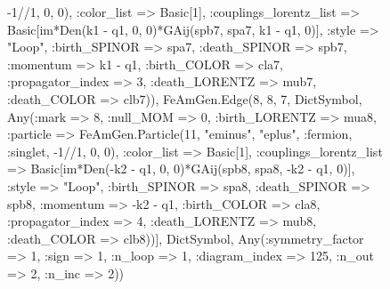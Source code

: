 \documentclass{revtex4}
\begin{document}
\begin{figure}[!htb]
\begin{center}
{-1//1, 0, 0), :color_list => Basic[1], :couplings_lorentz_list => Basic[im*Den(k1 - q1, 0, 0)*GAij(spb7, spa7, k1 - q1, 0)], :style => "Loop", :birth_SPINOR => spa7, :death_SPINOR => spb7, :momentum => k1 - q1, :birth_COLOR => cla7, :propagator_index => 3, :death_LORENTZ => mub7, :death_COLOR => clb7)), FeAmGen.Edge(8, 8, 7, Dict{Symbol, Any}(:mark => 8, :null_MOM => 0, :birth_LORENTZ => mua8, :particle => FeAmGen.Particle(11, "eminus", "eplus", :fermion, :singlet, -1//1, 0, 0), :color_list => Basic[1], :couplings_lorentz_list => Basic[im*Den(-k2 - q1, 0, 0)*GAij(spb8, spa8, -k2 - q1, 0)], :style => "Loop", :birth_SPINOR => spa8, :death_SPINOR => spb8, :momentum => -k2 - q1, :birth_COLOR => cla8, :propagator_index => 4, :death_LORENTZ => mub8, :death_COLOR => clb8))], Dict{Symbol, Any}(:symmetry_factor => 1, :sign => 1, :n_loop => 1, :diagram_index => 125, :n_out => 2, :n_inc => 2)) 
}
\end{center}
\end{figure}
\end{document}

